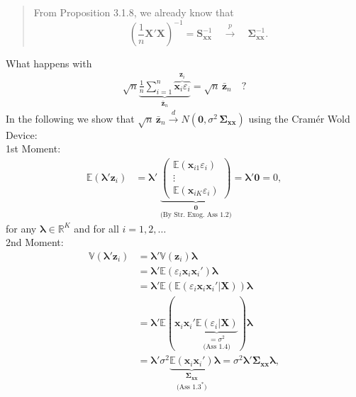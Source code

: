 \documentclass[]{book}
\theoremstyle{definition}
\theoremstyle{definition}
\theoremstyle{definition}
\theoremstyle{remark}
\begin{document}
\begin{quote}
From Proposition 3.1.8, we already know that
\[\left(\frac{1}{n}\mathbf{X}'\mathbf{X}\right)^{-1}=\mathbf{S}_{\mathbf{x}\mathbf{x}}^{-1}\quad\overset{p}\longrightarrow \quad\boldsymbol{\Sigma}_{\mathbf{x}\mathbf{x}}^{-1}.\]
\end{quote}

What happens with \[\begin{align*}
\sqrt{n}\underbrace{\frac{1}{n}\sum_{i=1}^n\overbrace{\mathbf{x}_i\varepsilon_i}^{\mathbf{z}_i}}_{\bar{\mathbf{z}}_n}=\sqrt{n}\,\bar{\mathbf{z}}_n\quad ?\end{align*}\]
In the following we show that
\(\sqrt{n}\,\bar{\mathbf{z}}_n\overset{d}\longrightarrow N(\mathbf{0},\sigma^2\,\boldsymbol{\Sigma}_{\mathbf{x}\mathbf{x}})\)
using the Cramér Wold Device:\\
1st Moment: \[\begin{align*}
\mathbb{E}(\boldsymbol{\lambda}'\mathbf{z}_i)&=
\boldsymbol{\lambda}'\;\underset{\text{(By Str.~Exog.~Ass 1.2)}}{\underbrace{\left(\begin{matrix}\mathbb{E}(\mathbf{x}_{i1}\varepsilon_i)\\\vdots\\\mathbb{E}(\mathbf{x}_{iK}\varepsilon_i)\end{matrix}\right)}_{\mathbf{0}}}=\boldsymbol{\lambda}'\mathbf{0}=0,\end{align*}\]
for any \(\boldsymbol{\lambda}\in\mathbb{R}^{K}\) and for all
\(i=1,2,\dots\)\\
2nd Moment: \[\begin{align*}
\mathbb{V}(\boldsymbol{\lambda}'\mathbf{z}_i)
&=\boldsymbol{\lambda}'\mathbb{V}(\mathbf{z}_i)\boldsymbol{\lambda}\\
&=\boldsymbol{\lambda}'\mathbb{E}(\varepsilon_i\mathbf{x}_i\mathbf{x}_i')\boldsymbol{\lambda}\\
&=\boldsymbol{\lambda}'\mathbb{E}(\mathbb{E}(\varepsilon_i\mathbf{x}_i\mathbf{x}_i'|\mathbf{X}))\boldsymbol{\lambda}\\
&=\boldsymbol{\lambda}'\mathbb{E}(\mathbf{x}_i\mathbf{x}_i'\underset{\text{(Ass 1.4)}}{\underbrace{\mathbb{E}(\varepsilon_i|\mathbf{X})}_{=\sigma^2}})\boldsymbol{\lambda}\\
&=\boldsymbol{\lambda}'\sigma^2\underset{\text{(Ass $1.3^\ast$)}}{\underbrace{\mathbb{E}(\mathbf{x}_i\mathbf{x}_i')}_{\boldsymbol{\Sigma}_{\mathbf{x}\mathbf{x}}}}\boldsymbol{\lambda}=\sigma^2\boldsymbol{\lambda}'\boldsymbol{\Sigma}_{\mathbf{x}\mathbf{x}}\boldsymbol{\lambda},\end{align*}\]
\end{document}
